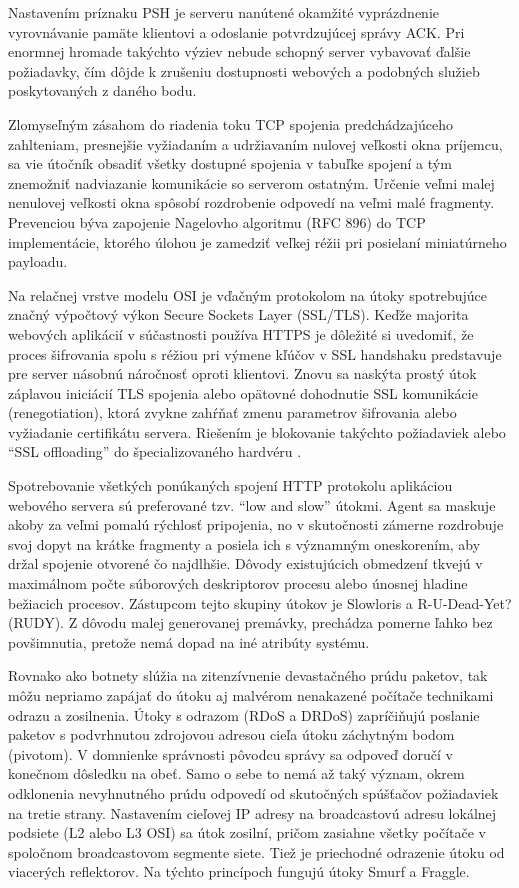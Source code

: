\documentclass[12pt, a4paper]{article}
\begin{document}
Nastavením príznaku PSH je serveru nanútené okamžité vyprázdnenie vyrovnávanie pamäte klientovi
a odoslanie potvrdzujúcej správy ACK. Pri enormnej hromade takýchto výziev nebude schopný server
vybavovať ďalšie požiadavky, čím dôjde k zrušeniu dostupnosti webových a podobných služieb poskytovaných
z daného bodu.

Zlomyseľným zásahom do riadenia toku TCP spojenia predchádzajúceho zahlteniam, presnejšie vyžiadaním a 
udržiavaním nulovej veľkosti okna príjemcu, sa vie útočník obsadiť všetky dostupné spojenia v tabuľke
spojení a tým znemožniť nadviazanie komunikácie so serverom ostatným. Určenie veľmi malej nenulovej
veľkosti okna spôsobí rozdrobenie odpovedí na veľmi malé fragmenty. Prevenciou býva zapojenie Nagelovho
algoritmu (RFC 896) do TCP implementácie, ktorého úlohou je zamedziť veľkej réžii pri posielaní 
miniatúrneho payloadu.

Na relačnej vrstve modelu OSI je vďačným protokolom na útoky spotrebujúce značný výpočtový výkon Secure
Sockets Layer (SSL/TLS). Keďže majorita webových aplikácií v súčastnosti používa HTTPS
je dôležité si uvedomiť, že proces šifrovania spolu s réžiou pri výmene kľúčov v SSL handshaku predstavuje 
pre server násobnú náročnosť oproti klientovi. Znovu sa naskýta prostý útok záplavou iniciácií TLS spojenia
alebo opätovné dohodnutie SSL komunikácie (renegotiation), ktorá zvykne zahŕňať zmenu parametrov šifrovania
alebo vyžiadanie certifikátu servera. Riešením je blokovanie takýchto požiadaviek alebo \enquote{SSL 
offloading} do špecializovaného hardvéru \cite{csirt-ddos}.

Spotrebovanie všetkých ponúkaných spojení HTTP protokolu aplikáciou webového servera sú preferované
tzv. \enquote{low and slow} útokmi. Agent sa maskuje akoby za veľmi pomalú rýchlosť pripojenia,
no v skutočnosti zámerne rozdrobuje svoj dopyt na krátke fragmenty a posiela ich s významným oneskorením,
aby držal spojenie otvorené čo najdlhšie. Dôvody existujúcich obmedzení tkvejú v maximálnom počte 
súborových deskriptorov procesu alebo únosnej hladine bežiacich procesov. Zástupcom tejto skupiny
útokov je Slowloris a R-U-Dead-Yet? (RUDY). Z dôvodu malej generovanej premávky, prechádza pomerne ľahko 
bez povšimnutia, pretože nemá dopad na iné atribúty systému.

Rovnako ako botnety slúžia na zitenzívnenie devastačného prúdu paketov, tak môžu nepriamo zapájať 
do útoku aj malvérom nenakazené počítače technikami odrazu a zosilnenia. Útoky s odrazom (RDoS a DRDoS) 
zapríčiňujú poslanie paketov s podvrhnutou zdrojovou adresou cieľa útoku záchytným bodom (pivotom).
V domnienke správnosti pôvodcu správy sa odpoveď doručí v konečnom dôsledku na obeť. Samo o sebe to nemá až 
taký význam, okrem odklonenia nevyhnutného prúdu odpovedí od skutočných spúšťačov požiadaviek na tretie
strany. Nastavením cieľovej IP adresy na broadcastovú adresu lokálnej podsiete (L2 alebo L3 OSI) sa
útok zosilní, pričom zasiahne všetky počítače v spoločnom broadcastovom segmente siete. Tiež je priechodné 
odrazenie útoku od viacerých reflektorov. Na týchto princípoch fungujú útoky Smurf a Fraggle.
\end{document}
